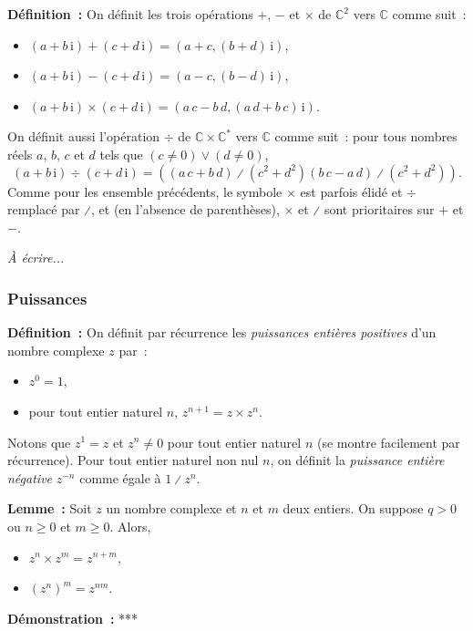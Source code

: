 \noindent\textbf{Définition :} 
    \sindex[isy]{$+$} \sindex[isy]{$-$} \sindex[isy]{$\times$} 
    On définit les trois opérations $+$, $-$ et $\times$ de $\mathbb{C}^2$ vers $\mathbb{C}$ comme suit :
    \begin{itemize}[nosep]
        \item $(a + b \, \mathrm{i}) + (c + d \, \mathrm{i}) = (a + c, (b + d) \, \mathrm{i})$,
        \item $(a + b \, \mathrm{i}) - (c + d \, \mathrm{i}) = (a - c, (b - d) \, \mathrm{i})$,
        \item $(a + b \, \mathrm{i}) \times (c + d \, \mathrm{i}) = (a \, c -  b \, d, (a \, d + b \, c) \, \mathrm{i})$.
    \end{itemize}
    \sindex[isy]{$\div$} \sindex[isy]{$\divslash$}
    On définit aussi l'opération $\div$ de $\mathbb{C} \times \mathbb{C}^*$ vers $\mathbb{C}$ comme suit : pour tous nombres réels $a$, $b$, $c$ et $d$ tels que $(c \neq 0) \vee (d \neq 0)$, 
    \begin{equation*}
        (a + b \, \mathrm{i}) \div (c + d \, \mathrm{i}) = 
        \left( 
            \left( a \, c + b \, d \right) \divslash \left( c^2 + d^2 \right)
            \left( b \, c - a \, d \right) \divslash \left( c^2 + d^2 \right)
        \right) .
    \end{equation*}
    Comme pour les ensemble précédents, le symbole $\times$ est parfois élidé et $\div$ remplacé par $\divslash$, et (en l'absence de parenthèses), $\times$ et $\divslash$ sont prioritaires sur $+$ et $-$.

\medskip

\emph{À écrire...}

\subsubsection{Puissances}

\noindent\textbf{Définition :} On définit par récurrence les \emph{puissances entières positives} d'un nombre complexe $z$ par :
    \begin{itemize}[nosep]
        \item $z^0 = 1$,
        \item pour tout entier naturel $n$, $z^{n+1} = z \times z^n$.
    \end{itemize}
    Notons que $z^1 = z$ et $z^n \neq 0$ pour tout entier naturel $n$ (se montre facilement par récurrence).
    Pour tout entier naturel non nul $n$, on définit la \emph{puissance entière négative} $z^{-n}$ comme égale à $1 \divslash z^n$.

\medskip

\noindent\textbf{Lemme :} Soit $z$ un nombre complexe et $n$ et $m$ deux entiers. 
    On suppose $q > 0$ ou $n \geq 0$ et $m \geq 0$.
    Alors, 
    \begin{itemize}[nosep]
        \item $z^n \times z^m = z^{n+m}$,
        \item $(z^n)^m = z^{n m}$.
    \end{itemize}

\medskip

\noindent\textbf{Démonstration :} ***

